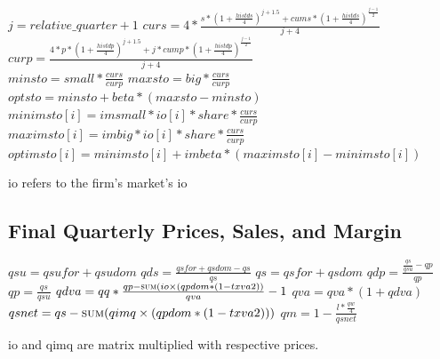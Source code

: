 \documentclass{article}
\begin{document}
\begin{algorithm}[H]
\caption{Reference Inventory Levels}
    \begin{algorithmic}
        \State \(j = relative\_quarter + 1\)
        \State \(curs = 4 * \frac{s * (1 + \frac{histds}{4})^{j+1.5} + cums * (1 + \frac{histds}{4})^{\frac{j-1}{2}}}{j + 4}\)
        \State \(curp = \frac{4 * p * (1 + \frac{histdp}{4})^{j + 1.5} + j * cump * (1 + \frac{histdp}{4})^{\frac{j - 1}{2}}}{j + 4}\)
        \\
        \State \(minsto = small * \frac{curs}{curp}\)
        \State \(maxsto = big * \frac{curs}{curp}\)
        \State \(optsto = minsto + beta * (maxsto - minsto)\)
        \\
        \State \(minimsto\left[i\right] = imsmall * io\left[i\right] * share * \frac{curs}{curp}\)
        \State \(maximsto\left[i\right] = imbig * io\left[i\right] * share * \frac{curs}{curp}\)
        \State \(optimsto\left[i\right] = minimsto\left[i\right] + imbeta * (maximsto\left[i\right] - minimsto\left[i\right])\)
        \EndFor
        \EndFunction
    \end{algorithmic}
    \small io refers to the firm's market's io
\end{algorithm}

\clearpage
\subsection{Final Quarterly Prices, Sales, and Margin}

\begin{algorithm}[H]
\caption{Finalqpqsqm}
    \begin{algorithmic}
        \State \(qsu = qsufor + qsudom\)
        \State \(qds = \frac{qsfor + qsdom - qs}{qs}\)
        \State \(qs = qsfor + qsdom\)
        \State \(qdp = \frac{\frac{qs}{qsu} - qp}{qp}\)
        \State \(qp = \frac{qs}{qsu}\)
        \State \(qdva = qq * \frac{qp - \Call{sum}{io \times (qpdom * (1 - txva2)}}{qva} - 1\)
        \State \(qva = qva * (1 + qdva)\)
        \State \(qsnet = qs - \Call{sum}{qimq \times (qpdom * (1 - txva2))}\)
        \State \(qm = 1 - \frac{l * \frac{qw}{4}}{qsnet}\)
        \EndFunction
    \end{algorithmic}
    \small io and qimq are matrix multiplied with respective prices.
\end{algorithm}
\end{document}
